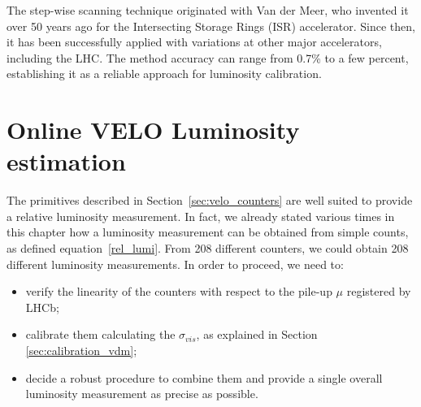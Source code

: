 The step-wise scanning technique originated with Van der Meer, who invented it over 50 years ago for the Intersecting Storage Rings (ISR) accelerator\cite{Carboni:156499}. Since then, it has been successfully applied with variations at other major accelerators\cite{Rubbia:1025746}, including the LHC. The method accuracy can range from 0.7\% to a few percent, establishing it as a reliable approach for luminosity calibration.


\section{Online VELO Luminosity estimation}\label{lumi_measure}
The primitives described in Section~\ref{sec:velo_counters} are well suited to provide a relative luminosity measurement. In fact, we already stated various times in this chapter how a luminosity measurement can be obtained from simple counts, as defined equation~\eqref{rel_lumi}. From 208 different counters, we could obtain 208 different luminosity measurements. 
In order to proceed, we need to:
\begin{itemize}
    \item verify the linearity of the counters with respect to the pile-up $\mu$ registered by LHCb;
    \item calibrate them calculating the $\sigma_{vis}$, as explained in Section \ref{sec:calibration_vdm};
    \item decide a robust procedure to combine them and provide a single overall luminosity measurement as precise as possible.
\end{itemize}

